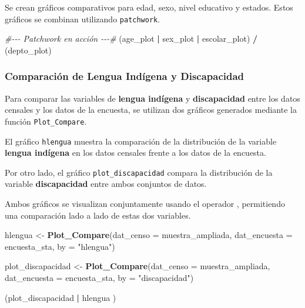\documentclass[
  12pt,
]{book}
\newenvironment{Shaded}{\begin{snugshade}}{\end{snugshade}}
\newcommand{\AttributeTok}[1]{\textcolor[rgb]{0.13,0.29,0.53}{#1}}
\newcommand{\CommentTok}[1]{\textcolor[rgb]{0.56,0.35,0.01}{\textit{#1}}}
\newcommand{\FunctionTok}[1]{\textcolor[rgb]{0.13,0.29,0.53}{\textbf{#1}}}
\newcommand{\NormalTok}[1]{#1}
\newcommand{\OtherTok}[1]{\textcolor[rgb]{0.56,0.35,0.01}{#1}}
\newcommand{\SpecialCharTok}[1]{\textcolor[rgb]{0.81,0.36,0.00}{\textbf{#1}}}
\newcommand{\StringTok}[1]{\textcolor[rgb]{0.31,0.60,0.02}{#1}}
\begin{document}
Se crean gráficos comparativos para edad, sexo, nivel educativo y estados. Estos gráficos se combinan utilizando \texttt{patchwork}.

\begin{Shaded}
\begin{Highlighting}[]
\CommentTok{\#{-}{-}{-} Patchwork en acción {-}{-}{-}\#}
\NormalTok{(age\_plot }\SpecialCharTok{|}\NormalTok{ sex\_plot }\SpecialCharTok{|}\NormalTok{ escolar\_plot) }\SpecialCharTok{/}\NormalTok{ (depto\_plot)}
\end{Highlighting}
\end{Shaded}

\hypertarget{comparaciuxf3n-de-lengua-induxedgena-y-discapacidad}{%
\subsubsection*{Comparación de Lengua Indígena y Discapacidad}\label{comparaciuxf3n-de-lengua-induxedgena-y-discapacidad}}

Para comparar las variables de \textbf{lengua indígena} y \textbf{discapacidad} entre los datos censales y los datos de la encuesta, se utilizan dos gráficos generados mediante la función \texttt{Plot\_Compare}.

El gráfico \texttt{hlengua} muestra la comparación de la distribución de la variable \textbf{lengua indígena} en los datos censales frente a los datos de la encuesta.

Por otro lado, el gráfico \texttt{plot\_discapacidad} compara la distribución de la variable \textbf{discapacidad} entre ambos conjuntos de datos.

Ambos gráficos se visualizan conjuntamente usando el operador \texttt{\textbar{}}, permitiendo una comparación lado a lado de estas dos variables.

\begin{Shaded}
\begin{Highlighting}[]
\NormalTok{hlengua }\OtherTok{\textless{}{-}} \FunctionTok{Plot\_Compare}\NormalTok{(}\AttributeTok{dat\_censo =}\NormalTok{ muestra\_ampliada,}
               \AttributeTok{dat\_encuesta =}\NormalTok{ encuesta\_sta,}
               \AttributeTok{by =} \StringTok{"hlengua"}\NormalTok{)}

\NormalTok{plot\_discapacidad }\OtherTok{\textless{}{-}} \FunctionTok{Plot\_Compare}\NormalTok{(}\AttributeTok{dat\_censo =}\NormalTok{ muestra\_ampliada,}
             \AttributeTok{dat\_encuesta =}\NormalTok{ encuesta\_sta,}
             \AttributeTok{by =} \StringTok{"discapacidad"}\NormalTok{)}

\NormalTok{(plot\_discapacidad }\SpecialCharTok{|}\NormalTok{ hlengua )}
\end{Highlighting}
\end{Shaded}
\end{document}
